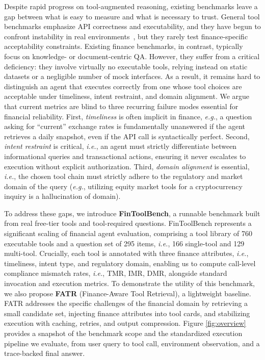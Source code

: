 \documentclass[sigconf,nonacm]{acmart}
\newcommand{\bench}{FinToolBench}
\newcommand{\tmr}{\textsc{TMR}\xspace}
\newcommand{\imr}{\textsc{IMR}\xspace}
\newcommand{\dmr}{\textsc{DMR}\xspace}
\begin{document}
Despite rapid progress on tool-augmented reasoning, existing benchmarks leave a gap between what is easy to measure and what is necessary to trust.
General tool benchmarks emphasize API correctness and executability, and they have begun to confront instability in real environments~\cite{guo2024stabletoolbench}, but they rarely test finance-specific acceptability constraints.
Existing finance benchmarks, in contrast, typically focus on knowledge- or document-centric QA. However, they suffer from a critical deficiency: they involve virtually no executable tools, relying instead on static datasets or a negligible number of mock interfaces.
As a result, it remains hard to distinguish an agent that executes correctly from one whose tool choices are acceptable under timeliness, intent restraint, and domain alignment.
We argue that current metrics are blind to three recurring failure modes essential for financial reliability.
First, \textit{timeliness} is often implicit in finance, \textit{e.g.}, a question asking for ``current'' exchange rates is fundamentally unanswered if the agent retrieves a daily snapshot, even if the API call is syntactically perfect.
Second, \textit{intent restraint} is critical, \textit{i.e.}, an agent must strictly differentiate between informational queries and transactional actions, ensuring it never escalates to execution without explicit authorization.
Third, \textit{domain alignment} is essential, \textit{i.e.}, the chosen tool chain must strictly adhere to the regulatory and market domain of the query (\textit{e.g.}, utilizing equity market tools for a cryptocurrency inquiry is a hallucination of domain).

To address these gaps, we introduce \textbf{\bench}, a runnable benchmark built from real free-tier tools and tool-required questions.
\bench{} represents a significant scaling of financial agent evaluation, comprising a tool library of 760 executable tools and a question set of 295 items, \textit{i.e.}, 166 single-tool and 129 multi-tool.
Crucially, each tool is annotated with three finance attributes, \textit{i.e.}, timeliness, intent type, and regulatory domain, enabling us to compute call-level compliance mismatch rates, \textit{i.e.}, \tmr{}, \imr{}, \dmr{}, alongside standard invocation and execution metrics.
To demonstrate the utility of this benchmark, we also propose \textbf{FATR} (Finance-Aware Tool Retrieval), a lightweight baseline.
FATR addresses the specific challenges of the financial domain by retrieving a small candidate set, injecting finance attributes into tool cards, and stabilizing execution with caching, retries, and output compression.
Figure \ref{fig:overview} provides a snapshot of the benchmark scope and the standardized execution pipeline we evaluate, from user query to tool call, environment observation, and a trace-backed final answer.
\end{document}
